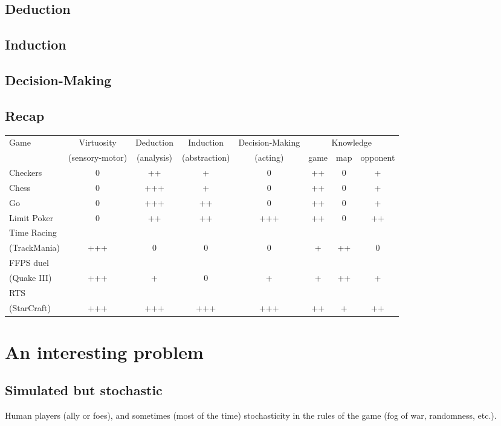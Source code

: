 \subsection{Deduction}
\subsection{Induction}
\subsection{Decision-Making}
\subsection{Recap}
\begin{sidewaystable}
\begin{tabular}{|l|ccccccc|}
\hline 
Game & Virtuosity & Deduction & Induction & Decision-Making & \multicolumn{3}{c|}{Knowledge} \\
     & (sensory-motor) & (analysis) & (abstraction) & (acting) & game & map & opponent \\
Checkers & 0 & ++ & + & 0 & ++&0&+ \\
Chess & 0 & +++ & + & 0 & ++&0&+ \\
Go & 0 & +++ & ++ & 0 & ++&0&+ \\
Limit Poker & 0 & ++ & ++ & +++ & ++&0&++ \\
Time Racing & & & & & & & \\
(TrackMania) & +++ & 0 & 0 & 0 & +&++&0 \\
FFPS duel & & & & & & & \\ 
(Quake III) & +++ & + & 0 & + & +&++&+ \\
RTS & & & & & & & \\
(StarCraft) & +++ & +++ & +++ & +++ & ++&+&++ \\
\hline
\end{tabular}
\end{sidewaystable}

\section{An interesting problem}
\subsection{Simulated but stochastic}
Human players (ally or foes), and sometimes (most of the time) stochasticity in the rules of the game (fog of war, randomness, etc.).
